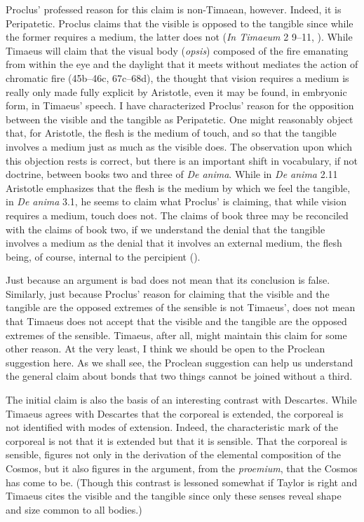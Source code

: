 Proclus' professed reason for this claim is non-Timaean, however. Indeed, it is Peripatetic. Proclus claims that the visible is opposed to the tangible since while the former requires a medium, the latter does not (\emph{In Timaeum} 2 9--11, \citealt{Diehl:1903re}). While Timaeus will claim that the visual body (\emph{opsis}) composed of the fire emanating from within the eye and the daylight that it meets without mediates the action of chromatic fire (45b--46c, 67c--68d), the thought that vision requires a medium is really only made fully explicit by Aristotle, even it may be found, in embryonic form, in Timaeus' speech. I have characterized Proclus' reason for the opposition between the visible and the tangible as Peripatetic. One might reasonably object that, for Aristotle, the flesh is the medium of touch, and so that the tangible involves a medium just as much as the visible does. The observation upon which this objection rests is correct, but there is an important shift in vocabulary, if not doctrine, between books two and three of \emph{De anima}. While in \emph{De anima} 2.11 Aristotle emphasizes that the flesh is the medium by which we feel the tangible, in \emph{De anima} 3.1, he seems to claim what Proclus' is claiming, that while vision requires a medium, touch does not. The claims of book three may be reconciled with the claims of book two, if we understand the denial that the tangible involves a medium as the denial that it involves an external medium, the flesh being, of course, internal to the percipient (\citealt[chapter 2.1.3]{Kalderon:2015fr}). 

Just because an argument is bad does not mean that its conclusion is false. Similarly, just because Proclus' reason for claiming that the visible and the tangible are the opposed extremes of the sensible is not Timaeus', does not mean that Timaeus does not accept that the visible and the tangible are the opposed extremes of the sensible. Timaeus, after all, might maintain this claim for some other reason. At the very least, I think we should be open to the Proclean suggestion here. As we shall see, the Proclean suggestion can help us understand the general claim about bonds that two things cannot be joined without a third.

The initial claim is also the basis of an interesting contrast with Descartes. While Timaeus agrees with Descartes that the corporeal is extended, the corporeal is not identified with modes of extension. Indeed, the characteristic mark of the corporeal is not that it is extended but that it is sensible. That the corporeal is sensible, figures not only in the derivation of the elemental composition of the Cosmos, but it also figures in the argument, from the \emph{proemium}, that the Cosmos has come to be. (Though this contrast is lessoned somewhat if Taylor is right and Timaeus cites the visible and the tangible since only these senses reveal shape and size common to all bodies.)

